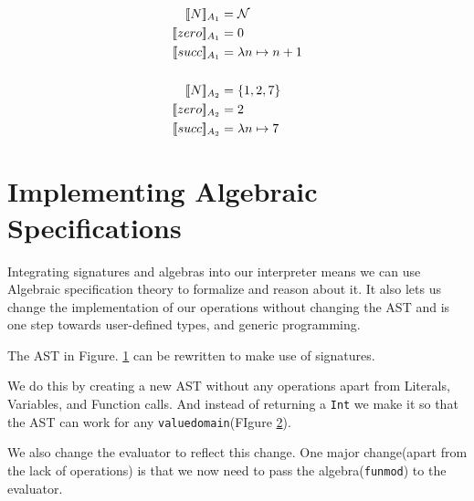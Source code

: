 \begin{align*}
    \alg{N}{A_1} &= \mathcal{N}\\
    \alg{zero}{A_1} &= 0\\
    \alg{succ}{A_1} &= \lambda n \mapsto n + 1\\
    &{}\\
    \alg{N}{A_2} &= \{1,2,7\}\\
    \alg{zero}{A_2} &= 2\\
    \alg{succ}{A_2} &= \lambda n \mapsto 7\\
\end{align*}



\section{Implementing Algebraic Specifications}
Integrating signatures and algebras into our interpreter means we can use Algebraic specification theory to formalize and reason about it.
It also lets us change the implementation of our operations without changing the AST and is one step towards user-defined types, and generic programming.

The AST in Figure. \ref{fig:signatures:ex1:ast} can be rewritten to make use of signatures.
\begin{figure}[!h]
    
    \label{fig:signatures:ex1:ast}
    \caption{}
\end{figure}

We do this by creating a new AST without any operations apart from Literals, Variables, and Function calls.
And instead of returning a \texttt{Int} we make it so that the AST can work for any \texttt{valuedomain}(FIgure \ref{fig:signatures:ex1:ast2}).
\begin{figure}[!h]
    
    \label{fig:signatures:ex1:ast2}
    \caption{}
\end{figure}
We also change the evaluator to reflect this change. One major change(apart from the lack of operations) is that we now need to pass the algebra(\texttt{funmod}) to the evaluator.

\begin{figure}[!h]
    
    \label{fig:signatures:ex1:eval}
    \caption{}
\end{figure}

